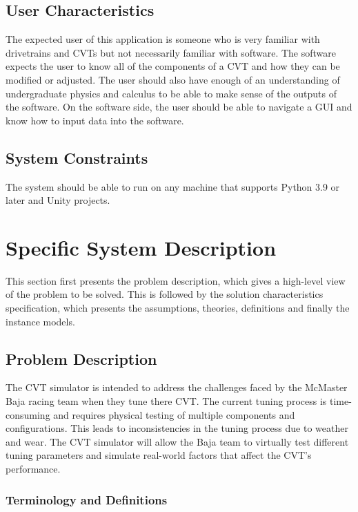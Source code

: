 \documentclass[12pt]{article}
\begin{document}
\subsection{User Characteristics} \label{SecUserCharacteristics}

The expected user of this application is someone who is very familiar with drivetrains and CVTs but not necessarily familiar with software.
The software expects the user to know all of the components of a CVT and how they can be modified or adjusted.
The user should also have enough of an understanding of undergraduate physics and calculus to be able to make sense of the outputs of the software.
On the software side, the user should be able to navigate a GUI and know how to input data into the software.

\subsection{System Constraints}

The system should be able to run on any machine that supports Python 3.9 or later and Unity projects.

\section{Specific System Description}

This section first presents the problem description, which gives a high-level
view of the problem to be solved.  This is followed by the solution characteristics
specification, which presents the assumptions, theories, definitions and finally
the instance models. 

\subsection{Problem Description} \label{Sec_pd}

The CVT simulator is intended to address the challenges faced by the McMaster Baja racing team when they tune there CVT.
The current tuning process is time-consuming and requires physical testing of multiple components and configurations. This leads to inconsistencies in the tuning process due to weather and wear.
The CVT simulator will allow the Baja team to virtually test different tuning parameters and simulate real-world factors that affect the CVT's performance.

\subsubsection{Terminology and  Definitions}
\end{document}
